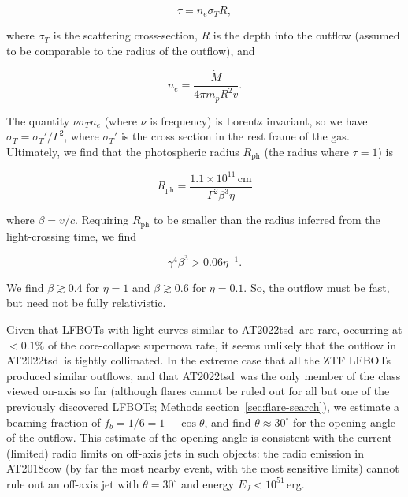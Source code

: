 \documentclass{nature_plusfigure}
\newcommand{\at}{AT2022tsd}
\begin{document}
\begin{methods}
\begin{equation}
\tau = n_e \sigma_T R,
\end{equation}

\noindent where $\sigma_T$ is the scattering cross-section, $R$ is the depth into the outflow (assumed to be comparable to the radius of the outflow), and

\begin{equation}
    n_e = \frac{\dot{M}}{4\pi m_p R^2 v}.
\end{equation}

\noindent The quantity $\nu \sigma_T n_e$ (where $\nu$ is frequency) is Lorentz invariant\cite{Rybicki1986}, so we have $\sigma_T = \sigma_T' / \Gamma^2$, where $\sigma_T'$ is the cross section in the rest frame of the gas. Ultimately, we find that the photospheric radius $R_\mathrm{ph}$ (the radius where $\tau=1$) is

\begin{equation}
    R_\mathrm{ph} = \frac{1.1 \times 10^{11}\,\mathrm{cm}}{ \Gamma^2 \beta^3 \eta}
\end{equation}

\noindent where $\beta=v/c$. Requiring $R_\mathrm{ph}$ to be smaller than the radius inferred from the light-crossing time, we find

\begin{equation}
    \gamma^4 \beta^3 > 0.06 \eta^{-1}.
\end{equation}

\noindent We find $\beta \gtrsim 0.4$ for $\eta=1$ and $\beta \gtrsim 0.6$ for $\eta=0.1$. So, the outflow must be fast, but need not be fully relativistic.

Given that LFBOTs with light curves similar to \at\ are rare, occurring at $<0.1\%$ of the core-collapse supernova rate\cite{Ho2022_RET}, it seems unlikely that the outflow in \at\ is tightly collimated. 
In the extreme case that all the ZTF LFBOTs produced similar outflows, and that \at\ was the only member of the class viewed on-axis so far (although flares cannot be ruled out for all but one of the previously discovered LFBOTs; Methods section~\ref{sec:flare-search}), we estimate a beaming fraction of $f_b = 1/6 = 1-\cos{\theta}$, and find $\theta\approx30^{\circ}$ for the opening angle of the outflow. This estimate of the opening angle is consistent with the current (limited) radio limits on off-axis jets in such objects: the radio emission in AT2018cow (by far the most nearby event, with the most sensitive limits) cannot\cite{Margutti2019} rule out an off-axis jet with $\theta=30^{\circ}$ and energy $E_J<10^{51}\,$erg.%


\end{methods}
\end{document}
